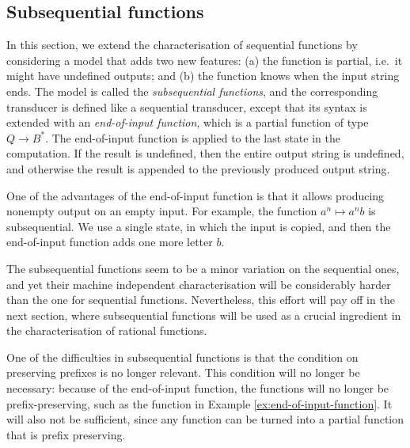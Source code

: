 \subsection{Subsequential functions}
\label{sec:subsequential}
In this section, we extend the   characterisation of sequential functions by considering a model that adds two new features: (a) the function is partial, i.e.~it might have undefined outputs; and (b) the function knows when the input string ends. The model is called the \emph{subsequential functions}, and the corresponding transducer is defined like a sequential transducer, except that its syntax is extended with  an \emph{end-of-input function}, which is a partial function  of type $Q \to B^*$.
The end-of-input function is applied to  the last state in the computation. If the result is undefined, then  the entire output string is undefined, and otherwise the result is appended to the previously produced output string.

\begin{myexample}[Append $b$]\label{ex:end-of-input-function}
    One of the advantages of the end-of-input function is that it allows producing nonempty output on an empty input. For example, the function $a^n \mapsto a^{n}b$ is subsequential. We use a single state, in which the input is copied, and then the end-of-input function adds one more letter $b$.
\end{myexample}

The subsequential functions seem to be a minor variation on the sequential ones, and yet their machine independent characterisation will be considerably harder than the one for sequential functions. Nevertheless, this effort will pay off in the next section, where subsequential functions will be used as a crucial ingredient in the characterisation of rational functions. 

One of the difficulties in subsequential functions is that the condition on preserving prefixes is no longer relevant. This condition will no longer be necessary:  because of the end-of-input function, the functions will no longer be prefix-preserving, such as the function in Example \ref{ex:end-of-input-function}. It will also not be sufficient, since any function can be turned into a partial function that is prefix preserving. 

